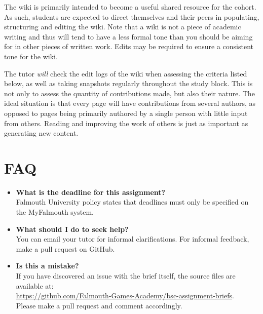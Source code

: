 \documentclass{../../fal_assignment}
\begin{document}
The wiki is primarily intended to become a useful shared resource for the cohort.
As such, students are expected to direct themselves and their peers in populating, structuring and editing the wiki.
Note that a wiki is not a piece of academic writing
and thus will tend to have a less formal tone than you should be aiming for in other pieces of written work.
Edits may be required to ensure a consistent tone for the wiki.

The tutor \emph{will} check the edit logs of the wiki when assessing the criteria listed below,
as well as taking snapshots regularly throughout the study block.
This is not only to assess the quantity of contributions made,
but also their nature.
The ideal situation is that every page will have contributions from several authors,
as opposed to pages being primarily authored by a single person with little input from others.
Reading and improving the work of others is just as important as generating new content.

\section*{FAQ}

\begin{itemize}
	\item 	\textbf{What is the deadline for this assignment?} \\ 
    		Falmouth University policy states that deadlines must only be specified on the MyFalmouth system.
    		
	\item 	\textbf{What should I do to seek help?} \\ 
    		You can email your tutor for informal clarifications. For informal feedback, make a pull request on GitHub. 
    		
    	\item 	\textbf{Is this a mistake?} \\ 	
    		If you have discovered an issue with the brief itself, the source files are available at: \\
    		\url{https://github.com/Falmouth-Games-Academy/bsc-assignment-briefs}.\\
    		 Please make a pull request and comment accordingly.
\end{itemize}

%
\end{document}
